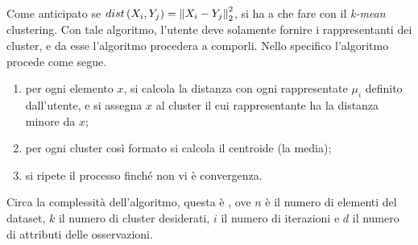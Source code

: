 \documentclass{subfiles}
\begin{document}
Come anticipato se $dist\left(X_{i}, Y_{j}\right) = \Norm{X_{i} - Y_{j}}[2]^{2}$, si ha a che fare con il \emph{k-mean} clustering.
Con tale algoritmo, l'utente deve solamente fornire i rappresentanti dei cluster, e da esse l'algoritmo procedera a comporli.
Nello specifico l'algoritmo procede come segue.
\begin{enumerate}
    \item per ogni elemento $x$, si calcola la distanza con ogni rappresentate $\mu_{i}$ definito dall'utente,
          e si assegna $x$ al cluster il cui rappresentante ha la distanza minore da $x$;
    \item per ogni cluster così formato si calcola il centroide (la media);
    \item si ripete il processo finché non vi è convergenza\footnotemark[2].
\end{enumerate}

Circa la complessità dell'algoritmo, questa è , ove $n$ è il numero di elementi del dataset, $k$ il numero di cluster desiderati,
$i$ il numero di iterazioni e $d$ il numero di attributi delle osservazioni.
\end{document}
